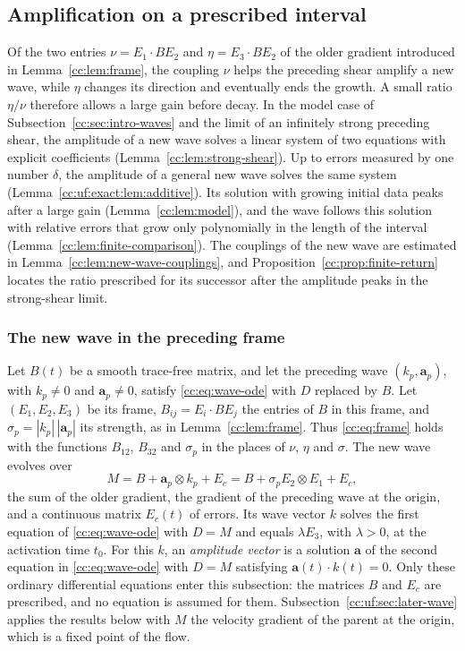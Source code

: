 \subsection{Amplification on a prescribed interval}\label{cc:sec:amplification}

Of the two entries $\nu=E_1\cdot BE_2$ and $\eta=E_3\cdot BE_2$ of the
older gradient introduced in Lemma~\ref{cc:lem:frame}, the coupling
$\nu$ helps the preceding shear amplify a new wave, while $\eta$
changes its direction and eventually ends the growth. A small ratio
$\eta/\nu$ therefore allows a large gain before decay. In the model
case of Subsection~\ref{cc:sec:intro-waves} and the limit of an
infinitely strong preceding shear, the amplitude of a new wave solves
a linear system of two equations with explicit coefficients
(Lemma~\ref{cc:lem:strong-shear}). Up to errors measured by one number
$\delta$, the amplitude of a general new wave solves the same system
(Lemma~\ref{cc:uf:exact:lem:additive}). Its solution with growing
initial data peaks after a large gain (Lemma~\ref{cc:lem:model}), and
the wave follows this solution with relative errors that grow only
polynomially in the length of the interval
(Lemma~\ref{cc:lem:finite-comparison}). The couplings of the new wave
are estimated in Lemma~\ref{cc:lem:new-wave-couplings}, and
Proposition~\ref{cc:prop:finite-return} locates the ratio prescribed
for its successor after the amplitude peaks in the strong-shear limit.

\subsubsection{The new wave in the preceding frame}\label{cc:sec:comparison}
Let $B(t)$ be a smooth trace-free matrix, and let the preceding wave
$(k_p,\mathbf a_p)$, with $k_p\ne0$ and $\mathbf a_p\ne0$, satisfy
\eqref{cc:eq:wave-ode} with $D$ replaced by $B$. Let $(E_1,E_2,E_3)$ be
its frame, $B_{ij}=E_i\cdot BE_j$ the entries of $B$ in this frame, and
$\sigma_p=|k_p|\,|\mathbf a_p|$ its strength, as in
Lemma~\ref{cc:lem:frame}. Thus \eqref{cc:eq:frame} holds with the
functions $B_{12}$, $B_{32}$ and $\sigma_p$ in the places of
$\nu$, $\eta$ and $\sigma$. The new wave evolves over
\[
 M=B+\mathbf a_p\otimes k_p+E_c=B+\sigma_p E_2\otimes E_1+E_c,
\]
the sum of the older gradient, the gradient of the preceding wave at
the origin, and a continuous matrix $E_c(t)$ of errors. Its wave vector
$k$ solves the first equation of \eqref{cc:eq:wave-ode} with $D=M$ and
equals $\lambda E_3$, with $\lambda>0$, at the activation time $t_0$.
For this $k$, an \emph{amplitude vector} is a solution $\mathbf a$ of
the second equation in \eqref{cc:eq:wave-ode} with $D=M$ satisfying
$\mathbf a(t)\cdot k(t)=0$. Only these ordinary differential equations
enter this subsection: the matrices $B$ and $E_c$ are prescribed, and no
equation is assumed for them. Subsection~\ref{cc:uf:sec:later-wave}
applies the results below with $M$ the velocity gradient of the parent
at the origin, which is a fixed point of the flow.

